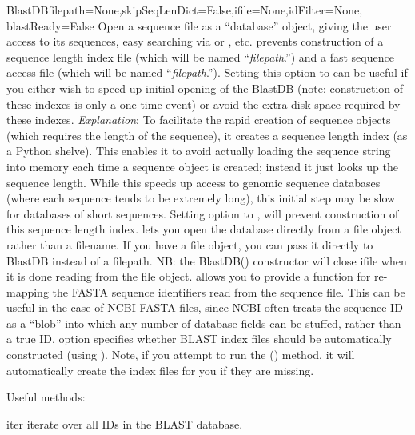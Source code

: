 \documentclass{howto}
\begin{document}
\begin{funcdesc}{BlastDB}{filepath=None,skipSeqLenDict=False,ifile=None,idFilter=None,
                 blastReady=False}
  Open a sequence file as a ``database'' object, giving the user access to its sequences,
  easy searching via  or , etc.
   prevents construction of a sequence length index file 
  (which will be named ``{\em filepath}.'') and a fast
  sequence access file (which will be named ``{\em filepath}.'').
  Setting this option to  can be useful if you either wish to
  speed up initial opening of the BlastDB (note: construction of these indexes is
  only a one-time event) or avoid the extra disk space required by these indexes.
  {\em Explanation}: To facilitate the rapid creation of sequence objects (which requires the length of the sequence), it creates a sequence length index (as a Python shelve).  This enables it to avoid actually loading the sequence string into memory each time a sequence object is created; instead it just looks up the sequence length.  While this speeds up access to genomic sequence databases (where each sequence tends to be extremely long), this initial step may be slow for databases of short sequences.  Setting  option to , will prevent construction of this sequence length index.
   lets you open the database directly from a file object rather
  than a filename.  If you have a file object, you can pass it directly to BlastDB instead of a filepath.  NB: the BlastDB() constructor will close ifile when it is done reading from the file object.
   allows you to provide a function for re-mapping the FASTA sequence
  identifiers read from the sequence file.  This can be useful in the case of
  NCBI FASTA files, since NCBI often treats the sequence ID as a ``blob'' into
  which any number of database fields can be stuffed, rather than a true ID.
   option specifies whether BLAST index files should be automatically
  constructed (using ).  Note, if you attempt to run the ()
  method, it will automatically create the index files for you if they are missing.
\end{funcdesc}

Useful methods:

\begin{funcdesc}{iter}{}
  iterate over all IDs in the BLAST database.
\end{funcdesc}
\end{document}
